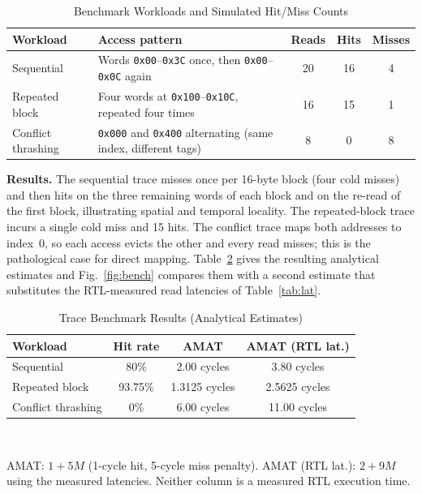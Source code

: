 \documentclass[conference,a4paper]{IEEEtran}
\begin{document}
\begin{table}[!t]
\caption{Benchmark Workloads and Simulated Hit/Miss Counts}\label{tab:traces}
\centering
\renewcommand{\arraystretch}{1.05}
\footnotesize
\begin{tabular}{@{}lp{3.0cm}ccc@{}}
\toprule
\textbf{Workload} & \textbf{Access pattern} & \textbf{Reads} & \textbf{Hits} & \textbf{Misses}\\
\midrule
Sequential & Words \texttt{0x00}--\texttt{0x3C} once, then \texttt{0x00}--\texttt{0x0C} again & 20 & 16 & 4\\
Repeated block & Four words at \texttt{0x100}--\texttt{0x10C}, repeated four times & 16 & 15 & 1\\
Conflict thrashing & \texttt{0x000} and \texttt{0x400} alternating (same index, different tags) & 8 & 0 & 8\\
\bottomrule
\end{tabular}
\end{table}

\textbf{Results.} The sequential trace misses once per 16-byte block (four cold misses) and then hits on the three remaining words of each block and on the re-read of the first block, illustrating spatial and temporal locality. The repeated-block trace incurs a single cold miss and 15 hits. The conflict trace maps both addresses to index~0, so each access evicts the other and every read misses; this is the pathological case for direct mapping. Table~\ref{tab:bench} gives the resulting analytical estimates and Fig.~\ref{fig:bench} compares them with a second estimate that substitutes the RTL-measured read latencies of Table~\ref{tab:lat}.

\begin{table}[!t]
\caption{Trace Benchmark Results (Analytical Estimates)}\label{tab:bench}
\centering
\renewcommand{\arraystretch}{1.05}
\footnotesize
\begin{tabular}{@{}lccc@{}}
\toprule
\textbf{Workload} & \textbf{Hit rate} & \textbf{AMAT} & \textbf{AMAT (RTL lat.)}\\
\midrule
Sequential & 80\% & 2.00 cycles & 3.80 cycles\\
Repeated block & 93.75\% & 1.3125 cycles & 2.5625 cycles\\
Conflict thrashing & 0\% & 6.00 cycles & 11.00 cycles\\
\bottomrule
\end{tabular}\\[2pt]
\parbox{\columnwidth}{\footnotesize AMAT: $1+5M$ (1-cycle hit, 5-cycle miss penalty). AMAT (RTL lat.): $2+9M$ using the measured latencies. Neither column is a measured RTL execution time.}
\end{table}
\end{document}

